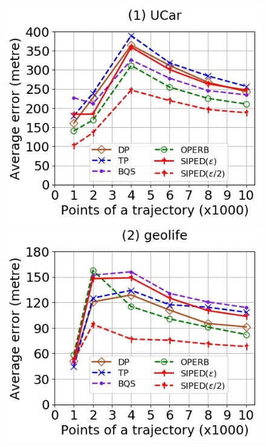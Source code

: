 \begin{figure}[tb!]
	\centering
	\includegraphics[scale=0.400]{Figures/Exp-when-PED-error-size-service.jpg} 	\hspace{2ex}
	\includegraphics[scale=0.400]{Figures/Exp-when-PED-error-size-geolife.jpg}	\hspace{2ex}

\end{figure}
